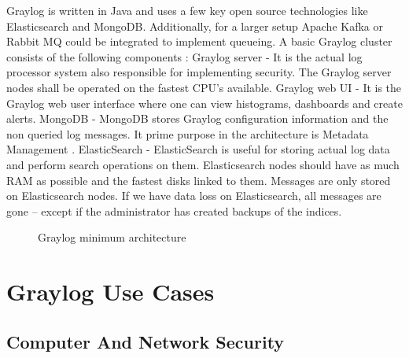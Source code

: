 \documentclass[9pt,twocolumn,twoside]{../../styles/osajnl}
\begin{document}
Graylog is written in Java and uses a few key open source technologies
like Elasticsearch and MongoDB. Additionally, for a larger setup
Apache Kafka \CE or Rabbit MQ \CE could be integrated to implement queueing.
A basic Graylog cluster consists of the following components \CE:
\newline
\newline
Graylog server - It is the actual log processor system also
responsible for implementing security. The Graylog server nodes shall
be operated on the fastest CPU's available.
\newline
\newline
Graylog web UI - It is the Graylog web user interface where one can
view histograms, dashboards and create alerts.
\newline
\newline
MongoDB - MongoDB stores Graylog configuration information and the non
queried log messages. It prime purpose in the architecture is Metadata
Management \cite{www-graylogprocessing-severalnines}.
\newline
\newline
ElasticSearch - ElasticSearch is useful for storing actual log data
and perform search operations on them. Elasticsearch nodes should have
as much RAM as possible and the fastest disks linked to them. Messages
are only stored on Elasticsearch nodes. If we have data loss on
Elasticsearch, all messages are gone – except if the administrator has
created backups of the indices.

\begin{figure}[htbp]
\centering
{}
\caption{\cite{www-graylog-docs} Graylog minimum architecture}
\label{fig:Graylog Minimum Architecture}
\end{figure}

\section{Graylog Use Cases}

\subsection{Computer And Network Security}
\end{document}
